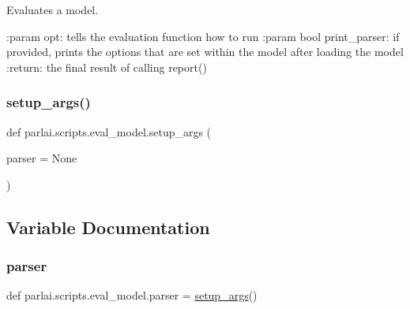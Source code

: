 \begin{DoxyVerb}Evaluates a model.

:param opt: tells the evaluation function how to run
:param bool print_parser: if provided, prints the options that are set within the
    model after loading the model
:return: the final result of calling report()
\end{DoxyVerb}
 \mbox{\label{namespaceparlai_1_1scripts_1_1eval__model_a2eaba0aa76c4d83e2a0f7f77c23479c8}} 
\subsubsection{\texorpdfstring{setup\+\_\+args()}{setup\_args()}}
{\footnotesize\ttfamily def parlai.\+scripts.\+eval\+\_\+model.\+setup\+\_\+args (\begin{DoxyParamCaption}\item[{}]{parser = {\ttfamily None} }\end{DoxyParamCaption})}



\subsection{Variable Documentation}
\mbox{\label{namespaceparlai_1_1scripts_1_1eval__model_ad0eac535b81763908ecc3cc63c12c885}} 
\subsubsection{\texorpdfstring{parser}{parser}}
{\footnotesize\ttfamily def parlai.\+scripts.\+eval\+\_\+model.\+parser = \hyperlink{namespaceparlai_1_1scripts_1_1eval__model_a2eaba0aa76c4d83e2a0f7f77c23479c8}{setup\+\_\+args}()}

